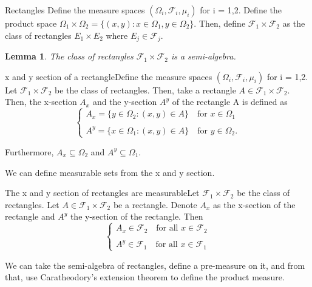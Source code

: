\documentclass[twoside]{article}
\newtheorem{lemma}[theorem]{Lemma}
\newcommand{\sigmalgebra}{\mathcal{F}}
\begin{document}
\begin{definition_exam}{Rectangles}{} Define the measure spaces $(\Omega_i, \sigmalgebra_i, \mu_i)$ for i = 1,2. Define the product space $\Omega_1 \times \Omega_2 = \{(x,y): x \in \Omega_1, y \in \Omega_2\}.$ Then, define $\sigmalgebra_1 \times \sigmalgebra_2$ as the class of rectangles $E_1 \times E_2$ where $E_j \in \sigmalgebra_j.$
\end{definition_exam}

\begin{lemma}The class of rectangles $\sigmalgebra_1 \times \sigmalgebra_2$ is a semi-algebra.
\end{lemma}

\begin{definition_exam}{x and y section of a rectangle}{}Define the measure spaces $(\Omega_i, \sigmalgebra_i, \mu_i)$ for i = 1,2. Let $\sigmalgebra_1 \times \sigmalgebra_2$ be the class of rectangles. Then, take a rectangle $A \in \sigmalgebra_1 \times \sigmalgebra_2.$ Then, the x-section $A_x$ and the y-section $A^y$ of the rectangle A is defined as 
$$
\begin{cases}
A_x = \{y \in \Omega_2: (x,y) \in A\} \quad \text{for } x \in \Omega_1\\\\
A^y = \{x \in \Omega_1: (x,y) \in A\} \quad \text{for } y \in \Omega_2.
\end{cases}
$$

Furthermore, $A_x \subseteq \Omega_2$ and $A^y \subseteq \Omega_1.$
\end{definition_exam}

We can define measurable sets from the x and y section.

\begin{proposition_exam}{The x and y section of rectangles are measurable}{}Let $\sigmalgebra_1 \times \sigmalgebra_2$ be the class of rectangles. Let $A \in \sigmalgebra_1 \times \sigmalgebra_2$ be a rectangle. Denote $A_x$ as the x-section of the rectangle and $A^y$ the y-section of the rectangle. Then 
$$
\begin{cases}
A_x \in \sigmalgebra_2 \quad \text{for all }x \in \sigmalgebra_2\\\\
A^y \in \sigmalgebra_1 \quad \text{for all }x \in \sigmalgebra_1
\end{cases}
$$
\end{proposition_exam}

We can take the semi-algebra of rectangles, define a pre-measure on it, and from that, use Caratheodory's extension theorem to define the product measure.
\end{document}
